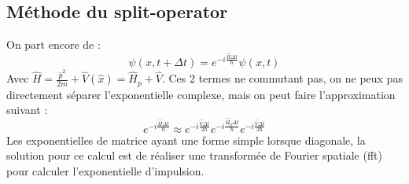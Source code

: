 \documentclass[11pt, a4paper, twocolumn]{article}
\begin{document}
\subsection{Méthode du split-operator}
On part encore de :
\begin{equation}
	\psi(x, t+\Delta t) = e^{-i\frac{\hat{H}\Delta t}{\hbar}}\psi(x, t)
\end{equation}
Avec $\hat{H} = \frac{\hat{p}^2}{2m} + \hat{V}(\hat{x}) = \hat{H}_p+\hat{V}$. Ces 2 termes ne commutant pas, on ne peux pas directement séparer l'exponentielle complexe, mais on peut faire l'approximation suivant :
\begin{equation}
	e^{-i\frac{\hat{H}\Delta t}{\hbar}}\approx e^{-i\frac{\hat{V}\Delta t}{2\hbar}}e^{-i\frac{\hat{H}_p\Delta t}{\hbar}}e^{-i\frac{\hat{V}\Delta t}{2\hbar}}
\end{equation}
Les exponentielles de matrice ayant une forme simple lorsque diagonale, la solution pour ce calcul est de réaliser une transformée de Fourier spatiale (fft) pour calculer l'exponentielle d'impulsion.
\end{document}
